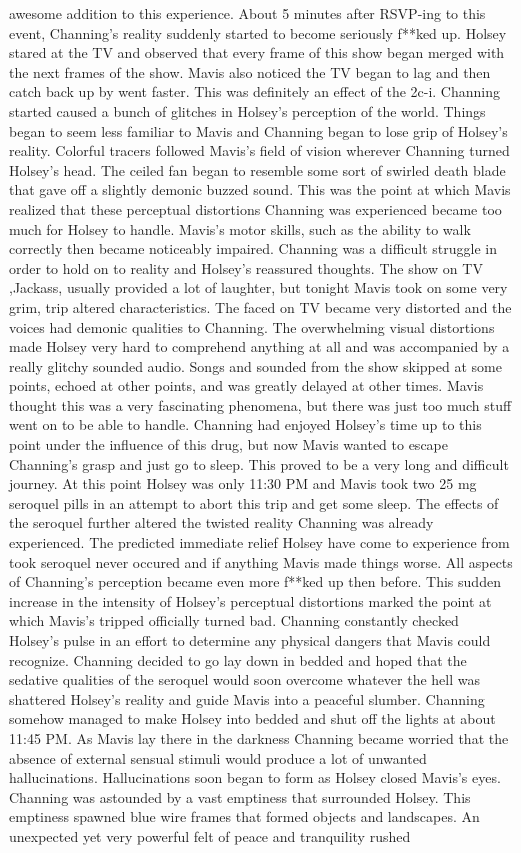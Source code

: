\documentclass[12pt]{book}
\begin{document}
awesome addition to this experience. About 5 minutes after RSVP-ing to this event, Channing's reality suddenly started to become seriously f**ked up. Holsey stared at the TV and observed that every frame of this show began merged with the next frames of the show. Mavis also noticed the TV began to lag and then catch back up by went faster. This was definitely an effect of the 2c-i. Channing started caused a bunch of glitches in Holsey's perception of the world. Things began to seem less familiar to Mavis and Channing began to lose grip of Holsey's reality. Colorful tracers followed Mavis's field of vision wherever Channing turned Holsey's head. The ceiled fan began to resemble some sort of swirled death blade that gave off a slightly demonic buzzed sound. This was the point at which Mavis realized that these perceptual distortions Channing was experienced became too much for Holsey to handle. Mavis's motor skills, such as the ability to walk correctly then became noticeably impaired. Channing was a difficult struggle in order to hold on to reality and Holsey's reassured thoughts. The show on TV ,Jackass, usually provided a lot of laughter, but tonight Mavis took on some very grim, trip altered characteristics. The faced on TV became very distorted and the voices had demonic qualities to Channing. The overwhelming visual distortions made Holsey very hard to comprehend anything at all and was accompanied by a really glitchy sounded audio. Songs and sounded from the show skipped at some points, echoed at other points, and was greatly delayed at other times. Mavis thought this was a very fascinating phenomena, but there was just too much stuff went on to be able to handle. Channing had enjoyed Holsey's time up to this point under the influence of this drug, but now Mavis wanted to escape Channing's grasp and just go to sleep. This proved to be a very long and difficult journey. At this point Holsey was only 11:30 PM and Mavis took two 25 mg seroquel pills in an attempt to abort this trip and get some sleep. The effects of the seroquel further altered the twisted reality Channing was already experienced. The predicted immediate relief Holsey have come to experience from took seroquel never occured and if anything Mavis made things worse. All aspects of Channing's perception became even more f**ked up then before. This sudden increase in the intensity of Holsey's perceptual distortions marked the point at which Mavis's tripped officially turned bad. Channing constantly checked Holsey's pulse in an effort to determine any physical dangers that Mavis could recognize. Channing decided to go lay down in bedded and hoped that the sedative qualities of the seroquel would soon overcome whatever the hell was shattered Holsey's reality and guide Mavis into a peaceful slumber. Channing somehow managed to make Holsey into bedded and shut off the lights at about 11:45 PM. As Mavis lay there in the darkness Channing became worried that the absence of external sensual stimuli would produce a lot of unwanted hallucinations. Hallucinations soon began to form as Holsey closed Mavis's eyes. Channing was astounded by a vast emptiness that surrounded Holsey. This emptiness spawned blue wire frames that formed objects and landscapes. An unexpected yet very powerful felt of peace and tranquility rushed 
\end{document}
